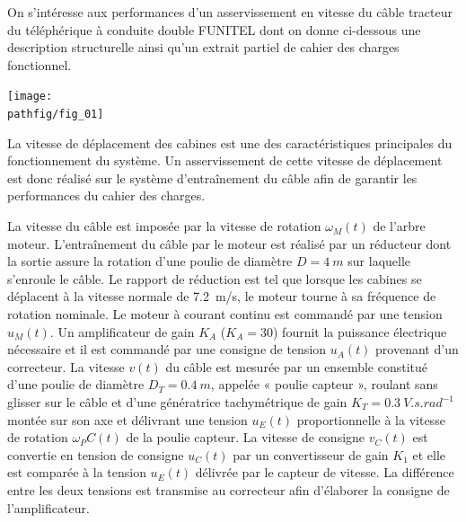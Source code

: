 \documentclass[10pt,fleqn]{article} %
\begin{document}

\vspace{5cm}
\pagestyle{fancy}
\thispagestyle{plain}

\def\columnseprulecolor{\color{ocre}}
\setlength{\columnseprule}{0.4pt} 

\def\pathfig{images}




On s’intéresse aux performances d’un asservissement en vitesse du câble tracteur du téléphérique à conduite double FUNITEL dont on donne ci-dessous une description structurelle ainsi qu’un extrait partiel de cahier des charges fonctionnel.  
\begin{center}
\texttt{[image: \\pathfig/fig\_01]}
\end{center}

La vitesse de déplacement des cabines est une des caractéristiques principales du fonctionnement du système. Un asservissement de cette vitesse de déplacement est donc réalisé sur le système d’entraînement du câble afin de garantir les performances du cahier des charges.  

La vitesse du câble est imposée par la vitesse de rotation $\omega_M(t)$ de l'arbre moteur. L’entraînement du câble par le moteur est réalisé par un réducteur dont la sortie assure la rotation d’une poulie de diamètre $D = \SI{4}{m}$ sur laquelle s’enroule le câble. Le rapport de réduction est tel que lorsque les cabines se déplacent à la vitesse normale de \SI{7,2}{m/s}, le moteur tourne à sa fréquence de rotation nominale. Le moteur à courant continu est commandé par une tension $u_M (t)$. Un amplificateur de gain $K_A$ ($K_A = 30$) fournit la puissance électrique nécessaire et il est commandé par une consigne de tension $u_A (t)$ provenant d'un correcteur. La vitesse $v(t)$ du câble est mesurée par un ensemble constitué d'une poulie de diamètre $D_T = \SI{0,4}{m}$, appelée « poulie capteur », roulant sans glisser sur le câble et d'une génératrice tachymétrique de gain $K_T = \SI{0,3}{V.s.rad^{-1}}$  montée sur son axe et délivrant une tension $u_E (t)$ proportionnelle à la vitesse de rotation $\omega_PC (t)$ de la poulie capteur. La vitesse de consigne $v_C (t)$ est convertie en tension de consigne $u_C (t)$ par un convertisseur de gain $K_1$ et elle est comparée à la tension $u_E (t)$ délivrée par le capteur de vitesse. La différence entre les deux tensions est transmise au correcteur afin d'élaborer la consigne de l'amplificateur. 
\end{document}
